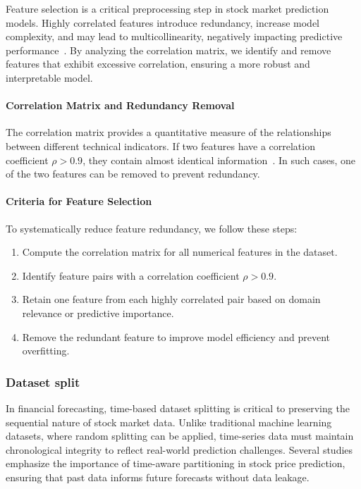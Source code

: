 Feature selection is a critical preprocessing step in stock market prediction models. Highly 
correlated features introduce redundancy, increase model complexity, and may lead to 
multicollinearity, negatively impacting predictive 
performance~\parencite{balasubramanian2023SystematicSurvey, guo2024LSTMStock}. By analyzing the
correlation matrix, we identify and remove features that exhibit excessive 
correlation, ensuring a more robust and interpretable model.

\paragraph{Correlation Matrix and Redundancy Removal}
The correlation matrix provides a quantitative measure of the relationships between different
technical indicators. If two features have a correlation coefficient \(\rho > 0.9\), they
contain almost identical information~\parencite{nabipour2020DeepLearning}. In such cases, one of
the two features can be removed to prevent redundancy.

\paragraph{Criteria for Feature Selection}
To systematically reduce feature redundancy, we follow these steps:
\begin{enumerate}
    \item Compute the correlation matrix for all numerical features in the dataset.
    \item Identify feature pairs with a correlation coefficient \(\rho > 0.9\).
    \item Retain one feature from each highly correlated pair based on domain relevance or predictive importance.
    \item Remove the redundant feature to improve model efficiency and prevent overfitting.
\end{enumerate}

\subsubsection{Dataset split}

In financial forecasting, time-based dataset splitting is critical to
preserving the sequential nature of stock market data. Unlike traditional
machine learning datasets, where random splitting can be applied, time-series
data must maintain chronological integrity to reflect real-world prediction
challenges. Several studies emphasize the importance of time-aware partitioning
in stock price prediction, ensuring that past data informs future forecasts
without data leakage.

